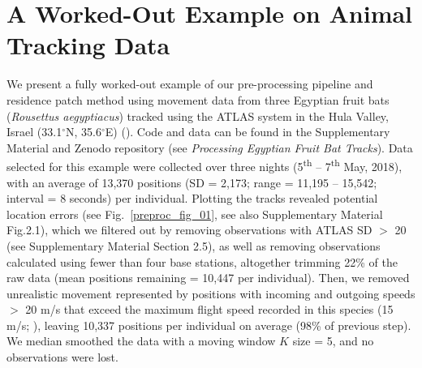     \section*{A Worked-Out Example on Animal Tracking Data}

    We present a fully worked-out example of our pre-processing pipeline and residence patch method using movement data from three Egyptian fruit bats (\textit{Rousettus aegyptiacus}) tracked using the ATLAS system in the Hula Valley, Israel (33.1$^{\circ}$N, 35.6$^{\circ}$E) (\citealt{toledo2020, lourie2021}).
    Code and data can be found in the Supplementary Material and Zenodo repository (see \textit{Processing Egyptian Fruit Bat Tracks}). 
    Data selected for this example were collected over three nights (5\textsuperscript{th} -- 7\textsuperscript{th} May, 2018), with an average of 13,370 positions (SD = 2,173; range = 11,195 -- 15,542; interval = 8 seconds) per individual.
    Plotting the tracks revealed potential location errors (see Fig.~\ref{preproc_fig_01}, see also Supplementary Material Fig.2.1), which we filtered out by removing observations with ATLAS SD $>$ 20 (see Supplementary Material Section 2.5), as well as removing observations calculated using fewer than four base stations, altogether trimming 22\% of the raw data (mean positions remaining = 10,447 per individual).
    Then, we removed unrealistic movement represented by positions with incoming and outgoing speeds $>$ 20 m/s that exceed the maximum flight speed recorded in this species (15 m/s; \citealt{tsoar2011}), leaving 10,337 positions per individual on average (98\% of previous step).
    We median smoothed the data with a moving window $K$ size = 5, and no observations were lost.

